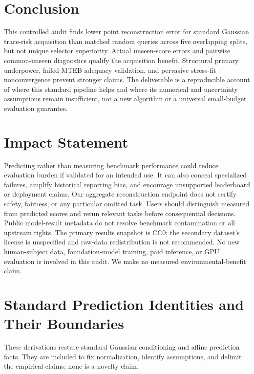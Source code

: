 \documentclass{article}
\begin{document}
\section{Conclusion}
\label{sec:conclusion}
This controlled audit finds lower point reconstruction error for standard Gaussian trace-risk acquisition than matched random queries across five overlapping splits, but not unique selector superiority. Actual unseen-score errors and pairwise common-unseen diagnostics qualify the acquisition benefit. Structural primary underpower, failed MTEB adequacy validation, and pervasive stress-fit nonconvergence prevent stronger claims. The deliverable is a reproducible account of where this standard pipeline helps and where its numerical and uncertainty assumptions remain insufficient, not a new algorithm or a universal small-budget evaluation guarantee.

\clearpage
\section*{Impact Statement}
Predicting rather than measuring benchmark performance could reduce evaluation burden if validated for an intended use. It can also conceal specialized failures, amplify historical reporting bias, and encourage unsupported leaderboard or deployment claims. Our aggregate reconstruction endpoint does not certify safety, fairness, or any particular omitted task. Users should distinguish measured from predicted scores and rerun relevant tasks before consequential decisions. Public model-result metadata do not resolve benchmark contamination or all upstream rights. The primary results snapshot is CC0; the secondary dataset's license is unspecified and raw-data redistribution is not recommended. No new human-subject data, foundation-model training, paid inference, or GPU evaluation is involved in this audit. We make no measured environmental-benefit claim.




\clearpage
\appendix
\onecolumn
\section{Standard Prediction Identities and Their Boundaries}
\label{app:identities}
These derivations restate standard Gaussian conditioning and affine prediction facts. They are included to fix normalization, identify assumptions, and delimit the empirical claims; none is a novelty claim.
\end{document}
